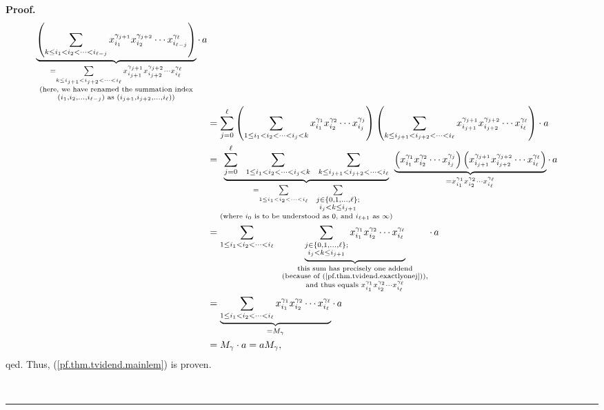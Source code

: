 \documentclass
[numbers=enddot,12pt,final,onecolumn,notitlepage,abstracton]{scrartcl}%
\theoremstyle{definition}
\newenvironment{proof}[1][Proof]{\noindent\textbf{#1.} }{\ \rule{0.5em}{0.5em}}
\newenvironment{verlong}{}{}
\let\sumnonlimits\sum
\renewcommand{\sum}{\sumnonlimits\limits}
\begin{document}
\begin{verlong}
\begin{proof}
\begin{align*}
\underbrace{\left(  \sum_{k\leq i_{1}<i_{2}<\cdots<i_{\ell-j}}x_{i_{1}%
}^{\gamma_{j+1}}x_{i_{2}}^{\gamma_{j+2}}\cdots x_{i_{\ell-j}}^{\gamma_{\ell}%
}\right)  }_{\substack{=\sum_{k\leq i_{j+1}<i_{j+2}<\cdots<i_{\ell}}%
x_{i_{j+1}}^{\gamma_{j+1}}x_{i_{j+2}}^{\gamma_{j+2}}\cdots x_{i_{\ell}%
}^{\gamma_{\ell}}\\\text{(here, we have renamed the summation index}\\\left(
i_{1},i_{2},\ldots,i_{\ell-j}\right)  \text{ as }\left(  i_{j+1}%
,i_{j+2},\ldots,i_{\ell}\right)  \text{)}}}\cdot\,a\\
&  =\sum_{j=0}^{\ell}\left(  \sum_{1\leq i_{1}<i_{2}<\cdots<i_{j}<k}x_{i_{1}%
}^{\gamma_{1}}x_{i_{2}}^{\gamma_{2}}\cdots x_{i_{j}}^{\gamma_{j}}\right)
\left(  \sum_{k\leq i_{j+1}<i_{j+2}<\cdots<i_{\ell}}x_{i_{j+1}}^{\gamma_{j+1}%
}x_{i_{j+2}}^{\gamma_{j+2}}\cdots x_{i_{\ell}}^{\gamma_{\ell}}\right)  \cdot
a\\
&  =\underbrace{\sum_{j=0}^{\ell}\ \ \sum_{1\leq i_{1}<i_{2}<\cdots<i_{j}%
<k}\ \ \sum_{k\leq i_{j+1}<i_{j+2}<\cdots<i_{\ell}}}_{\substack{=\sum_{1\leq
i_{1}<i_{2}<\cdots<i_{\ell}}\ \ \sum_{\substack{j\in\left\{  0,1,\ldots
,\ell\right\}  ;\\i_{j}<k\leq i_{j+1}}}\\\text{(where }i_{0}\text{ is to be
understood as }0\text{, and }i_{\ell+1}\text{ as }\infty\text{)}%
}}\underbrace{\left(  x_{i_{1}}^{\gamma_{1}}x_{i_{2}}^{\gamma_{2}}\cdots
x_{i_{j}}^{\gamma_{j}}\right)  \left(  x_{i_{j+1}}^{\gamma_{j+1}}x_{i_{j+2}%
}^{\gamma_{j+2}}\cdots x_{i_{\ell}}^{\gamma_{\ell}}\right)  }_{=x_{i_{1}%
}^{\gamma_{1}}x_{i_{2}}^{\gamma_{2}}\cdots x_{i_{\ell}}^{\gamma_{\ell}}}%
\cdot\,a\\
&  =\sum_{1\leq i_{1}<i_{2}<\cdots<i_{\ell}}\ \ \underbrace{\sum
_{\substack{j\in\left\{  0,1,\ldots,\ell\right\}  ;\\i_{j}<k\leq i_{j+1}%
}}x_{i_{1}}^{\gamma_{1}}x_{i_{2}}^{\gamma_{2}}\cdots x_{i_{\ell}}%
^{\gamma_{\ell}}}_{\substack{\text{this sum has precisely one addend}%
\\\text{(because of (\ref{pf.thm.tvidend.exactlyonej})),}\\\text{and thus
equals }x_{i_{1}}^{\gamma_{1}}x_{i_{2}}^{\gamma_{2}}\cdots x_{i_{\ell}%
}^{\gamma_{\ell}}}}\cdot\,a\\
&  =\underbrace{\sum_{1\leq i_{1}<i_{2}<\cdots<i_{\ell}}x_{i_{1}}^{\gamma_{1}%
}x_{i_{2}}^{\gamma_{2}}\cdots x_{i_{\ell}}^{\gamma_{\ell}}}_{=M_{\gamma}}%
\cdot\,a\\
&  =M_{\gamma}\cdot a=aM_{\gamma},
\end{align*}
qed. Thus, (\ref{pf.thm.tvidend.mainlem}) is proven.


\end{proof}
\end{verlong}
\end{document}
